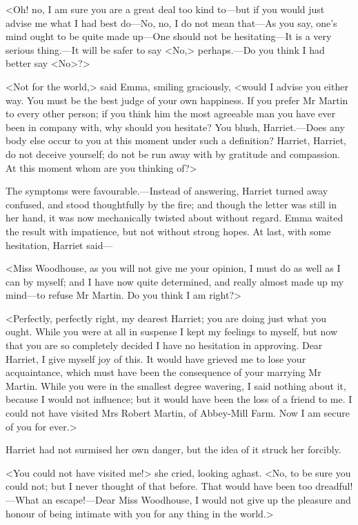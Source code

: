 <Oh! no, I am sure you are a great deal too kind to—but if you would just advise me what I had best do—No, no, I do not mean that—As you say, one's mind ought to be quite made up—One should not be hesitating—It is a very serious thing.—It will be safer to say <No,> perhaps.—Do you think I had better say <No>?>

<Not for the world,> said Emma, smiling graciously, <would I advise you either way. You must be the best judge of your own happiness. If you prefer Mr Martin to every other person; if you think him the most agreeable man you have ever been in company with, why should you hesitate? You blush, Harriet.—Does any body else occur to you at this moment under such a definition? Harriet, Harriet, do not deceive yourself; do not be run away with by gratitude and compassion. At this moment whom are you thinking of?>

The symptoms were favourable.—Instead of answering, Harriet turned away confused, and stood thoughtfully by the fire; and though the letter was still in her hand, it was now mechanically twisted about without regard. Emma waited the result with impatience, but not without strong hopes. At last, with some hesitation, Harriet said—

<Miss Woodhouse, as you will not give me your opinion, I must do as well as I can by myself; and I have now quite determined, and really almost made up my mind—to refuse Mr Martin. Do you think I am right?>

<Perfectly, perfectly right, my dearest Harriet; you are doing just what you ought. While you were at all in suspense I kept my feelings to myself, but now that you are so completely decided I have no hesitation in approving. Dear Harriet, I give myself joy of this. It would have grieved me to lose your acquaintance, which must have been the consequence of your marrying Mr Martin. While you were in the smallest degree wavering, I said nothing about it, because I would not influence; but it would have been the loss of a friend to me. I could not have visited Mrs Robert Martin, of Abbey-Mill Farm. Now I am secure of you for ever.>

Harriet had not surmised her own danger, but the idea of it struck her forcibly.

<You could not have visited me!> she cried, looking aghast. <No, to be sure you could not; but I never thought of that before. That would have been too dreadful!—What an escape!—Dear Miss Woodhouse, I would not give up the pleasure and honour of being intimate with you for any thing in the world.>


